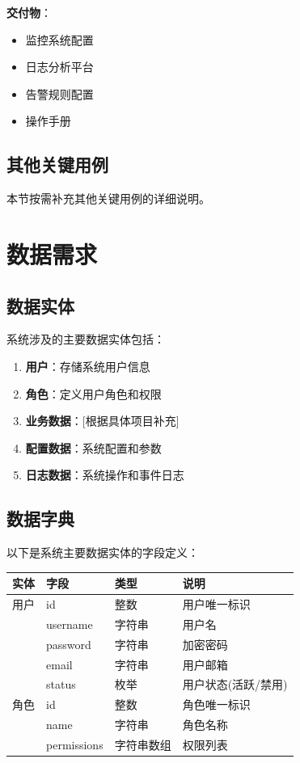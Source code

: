 \documentclass[a4paper,12pt]{article}
\begin{document}
\textbf{交付物}：
\begin{itemize}
  \item 监控系统配置
  \item 日志分析平台
  \item 告警规则配置
  \item 操作手册
\end{itemize}

\subsection{其他关键用例}

本节按需补充其他关键用例的详细说明。

\section{数据需求}

\subsection{数据实体}

系统涉及的主要数据实体包括：

\begin{enumerate}
  \item \textbf{用户}：存储系统用户信息
  \item \textbf{角色}：定义用户角色和权限
  \item \textbf{业务数据}：[根据具体项目补充]
  \item \textbf{配置数据}：系统配置和参数
  \item \textbf{日志数据}：系统操作和事件日志
\end{enumerate}

\subsection{数据字典}

以下是系统主要数据实体的字段定义：

\begin{longtable}{|p{3cm}|p{3cm}|p{3cm}|p{6cm}|}
\hline
\textbf{实体} & \textbf{字段} & \textbf{类型} & \textbf{说明} \\
\hline
\endhead
用户 & id & 整数 & 用户唯一标识 \\
\hline
 & username & 字符串 & 用户名 \\
\hline
 & password & 字符串 & 加密密码 \\
\hline
 & email & 字符串 & 用户邮箱 \\
\hline
 & status & 枚举 & 用户状态(活跃/禁用) \\
\hline
角色 & id & 整数 & 角色唯一标识 \\
\hline
 & name & 字符串 & 角色名称 \\
\hline
 & permissions & 字符串数组 & 权限列表 \\
\hline
\end{longtable}
\end{document}
